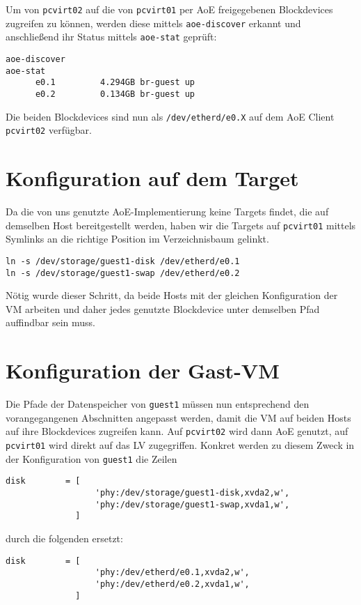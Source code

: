 Um von \verb#pcvirt02# auf die von \verb#pcvirt01# per AoE freigegebenen Blockdevices zugreifen zu können, werden diese mittels \verb#aoe-discover# erkannt und anschließend ihr Status mittels \verb#aoe-stat# geprüft:
\setupVerbatimOut
\begin{verbatim}
aoe-discover 
aoe-stat 
      e0.1         4.294GB br-guest up 
      e0.2         0.134GB br-guest up  
\end{verbatim}

Die beiden Blockdevices sind nun als \verb#/dev/etherd/e0.X# auf dem AoE Client \verb#pcvirt02# verfügbar.

\section{Konfiguration auf dem Target}\label{dirtysym}
Da die von uns genutzte AoE-Implementierung keine Targets findet, die auf demselben Host bereitgestellt werden, haben wir die Targets auf \verb#pcvirt01# mittels Symlinks an die richtige Position im Verzeichnisbaum gelinkt.
\setupVerbatimOut
\begin{verbatim}
ln -s /dev/storage/guest1-disk /dev/etherd/e0.1
ln -s /dev/storage/guest1-swap /dev/etherd/e0.2 
\end{verbatim}

Nötig wurde dieser Schritt, da beide Hosts mit der gleichen Konfiguration der VM arbeiten und daher jedes genutzte Blockdevice unter demselben Pfad auffindbar sein muss.

\section{Konfiguration der Gast-VM }
Die Pfade der Datenspeicher von \verb#guest1# müssen nun entsprechend den vorangegangenen Abschnitten angepasst werden, damit die VM auf beiden Hosts auf ihre Blockdevices zugreifen kann. Auf \verb#pcvirt02# wird dann AoE genutzt, auf \verb#pcvirt01# wird direkt auf das LV zugegriffen.
Konkret werden zu diesem Zweck in der Konfiguration von \verb#guest1# die Zeilen
\setupVerbatimOut
\begin{verbatim}
disk        = [
                  'phy:/dev/storage/guest1-disk,xvda2,w',
                  'phy:/dev/storage/guest1-swap,xvda1,w',
              ]
\end{verbatim}
durch die folgenden ersetzt:
\setupVerbatimOut
\begin{verbatim}
disk        = [
                  'phy:/dev/etherd/e0.1,xvda2,w',
                  'phy:/dev/etherd/e0.2,xvda1,w',
              ]
\end{verbatim}

